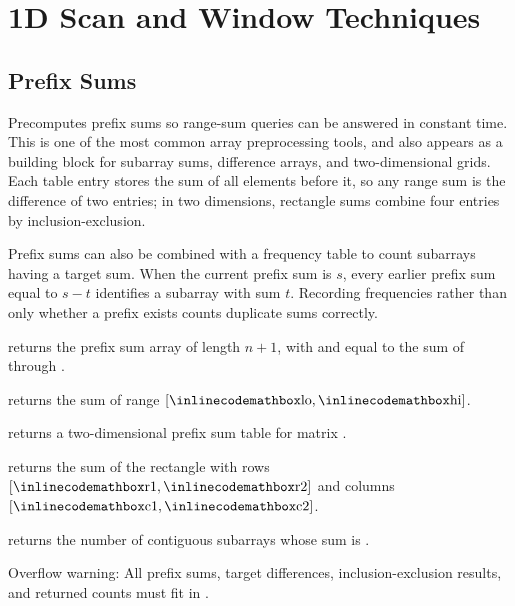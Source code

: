 \section{\texorpdfstring{1D Scan and Window Techniques}{1.2 1D Scan and Window Techniques}}
\setcounter{section}{2}
\setcounter{subsection}{0}
\subsection{Prefix Sums}
\label{sec:1.2.1}
Precomputes prefix sums so range-sum queries can be answered in constant time. This is one of the most common array preprocessing tools, and also appears as a building block for subarray sums, difference arrays, and two-dimensional grids. Each table entry stores the sum of all elements before it, so any range sum is the difference of two entries; in two dimensions, rectangle sums combine four entries by inclusion-exclusion.

Prefix sums can also be combined with a frequency table to count subarrays having a target sum. When the current prefix sum is $s$, every earlier prefix sum equal to $s - t$ identifies a subarray with sum $t$. Recording frequencies rather than only whether a prefix exists counts duplicate sums correctly.

\begin{compactitem}
  \item {} returns the prefix sum array  of length $n + 1$, with  and  equal to the sum of  through .
  \item {} returns the sum of range $[{\inlinecodemath{lo}}, {\inlinecodemath{hi}}]$.
  \item {} returns a two-dimensional prefix sum table for matrix .
  \item {} returns the sum of the rectangle with rows $[{\inlinecodemath{r1}}, {\inlinecodemath{r2}}]$ and columns $[{\inlinecodemath{c1}}, {\inlinecodemath{c2}}]$.
  \item {} returns the number of contiguous subarrays whose sum is .
\end{compactitem}

Overflow warning: All prefix sums, target differences, inclusion-exclusion results, and returned counts must fit in .

